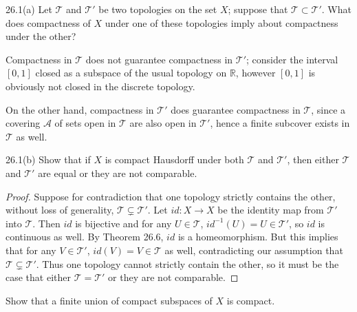 \documentclass[11pt]{article}
\begin{document}



\begin{ex}{26.1(a)}
  Let $\mathcal{T}$ and $\mathcal{T}'$ be two topologies on the set $X$; suppose
  that $\mathcal{T} \subset \mathcal{T}'$. What does compactness of $X$ under
  one of these topologies imply about compactness under the other?
\end{ex}

\begin{solution}
  Compactness in $\mathcal{T}$ does not guarantee compactness in $\mathcal{T}'$;
  consider the interval $[0, 1]$ closed as a subspace of the usual topology on
  $\mathbb{R}$, however $[0, 1]$ is obviously not closed in the discrete
  topology.

  On the other hand, compactness in $\mathcal{T}'$ does guarantee compactness in
  $\mathcal{T}$, since a covering $\mathcal{A}$ of sets open in $\mathcal{T}$
  are also open in $\mathcal{T}'$, hence a finite subcover exists in
  $\mathcal{T}$ as well.
\end{solution}

\begin{ex}{26.1(b)}
  Show that if $X$ is compact Hausdorff under both $\mathcal{T}$ and
  $\mathcal{T}'$, then either $\mathcal{T}$ and $\mathcal{T}'$ are equal or they
  are not comparable.
\end{ex}

\begin{proof}
  Suppose for contradiction that one topology strictly contains the other,
  without loss of generality, $\mathcal{T} \subsetneq \mathcal{T}'$. Let $id: X
  \to X$ be the identity map from $\mathcal{T}'$ into $\mathcal{T}$. Then $id$
  is bijective and for any $U \in \mathcal{T}$, $id^{-1}(U) = U \in
  \mathcal{T}'$, so $id$ is continuous as well. By Theorem 26.6, $id$ is a
  homeomorphism. But this implies that for any $V \in \mathcal{T}'$, $id(V) = V
  \in \mathcal{T}$ as well, contradicting our assumption that $\mathcal{T}
  \subsetneq \mathcal{T}'$. Thus one topology cannot strictly contain the other,
  so it must be the case that either $\mathcal{T} = \mathcal{T}'$ or they are
  not comparable.
\end{proof}

\begin{ex}{26.3}
  Show that a finite union of compact subspaces of $X$ is compact.
\end{ex}
\end{document}
